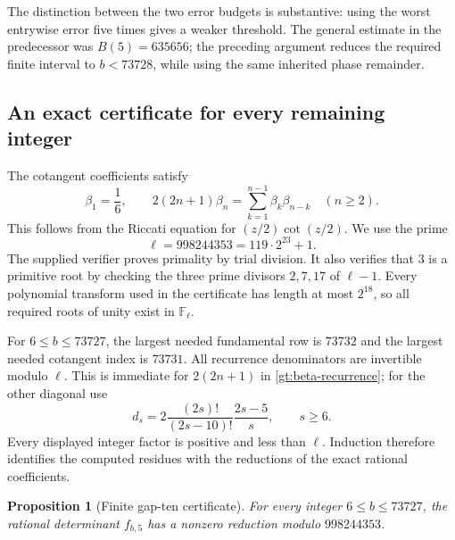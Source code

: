 \documentclass[11pt,a4paper]{article}
\newtheorem{proposition}[theorem]{Proposition}
\theoremstyle{definition}
\theoremstyle{remark}
\numberwithin{equation}{section}
\begin{document}
The distinction between the two error budgets is substantive: using
the worst entrywise error five times gives a weaker threshold.
The general estimate in the predecessor was $B(5)=635656$;
the preceding argument reduces the required finite interval to
$b<73728$, while using the same inherited phase remainder.

\subsection{An exact certificate for every remaining integer}

The cotangent coefficients satisfy
\begin{equation}\label{gt:beta-recurrence}
 \beta_1=\frac16,\qquad
 2(2n+1)\beta_n=\sum_{k=1}^{n-1}\beta_k\beta_{n-k}
                                      \quad(n\ge2).
\end{equation}
This follows from the Riccati equation for $(z/2)\cot(z/2)$.
We use the prime
\[
                         \ell=998244353=119\cdot2^{23}+1.
\]
The supplied verifier proves primality by trial division. It also
verifies that $3$ is a primitive root by checking the three prime
divisors $2,7,17$ of $\ell-1$. Every polynomial transform used in
the certificate has length at most $2^{18}$, so all required roots
of unity exist in $\mathbb F_\ell$.

For $6\le b\le73727$, the largest needed fundamental row is
$73732$ and the largest needed cotangent index is $73731$.
All recurrence denominators are invertible modulo $\ell$.
This is immediate for $2(2n+1)$ in \eqref{gt:beta-recurrence};
for the other diagonal use
\begin{equation}\label{gt:d-factor}
 d_s=2\frac{(2s)!}{(2s-10)!}\frac{2s-5}{s},\qquad s\ge6.
\end{equation}
Every displayed integer factor is positive and less than $\ell$.
Induction therefore identifies the computed residues with the
reductions of the exact rational coefficients.

\begin{proposition}[Finite gap-ten certificate]
\label{gt:finite}
For every integer $6\le b\le73727$, the rational determinant
$f_{b,5}$ has a nonzero reduction modulo $998244353$.
\end{proposition}
\end{document}
